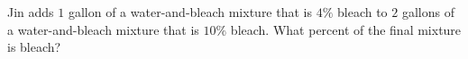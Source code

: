 Jin adds $1$ gallon of a water-and-bleach mixture that is $4\%$ bleach to $2$ gallons of a water-and-bleach mixture that is $10\%$ bleach. What percent of the final mixture is bleach?
